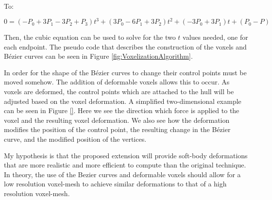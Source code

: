 \begin{center}
To:
\end{center}

\[0 = (-P_0 + 3P_1 - 3P_2 + P_3)t^3 + (3P_0 - 6P_1 + 3P_2)t^2 + (-3P_0 + 3P_1)t + (P_0 - P)\]

Then, the cubic equation can be used to solve for the two \(t\) values needed, one for each 
endpoint. The pseudo code that describes the construction of the voxels and Bézier curves can be 
seen in Figure \ref{fig:VoxelizationAlgorithm}.

In order for the shape of the Bézier curves to change their control points must be moved somehow.
The addition of deformable voxels allows this to occur. As voxels are deformed, the control points
which are attached to the hull will be adjusted based on the voxel deformation. A simplified 
two-dimensional example can be seen in Figure \ref{}. Here we see the direction which force is 
applied to the voxel and the resulting voxel deformation. We also see how the deformation modifies
the position of the control point, the resulting change in the Bézier curve, and the modified 
position of the vertices.



My hypothesis is that the proposed extension will provide soft-body deformations that are more
realistic and more efficient to compute than the original technique. In theory, the use of the
Bezier curves and deformable voxels should allow for a low resolution voxel-mesh to achieve similar
deformations to that of a high resolution voxel-mesh.


